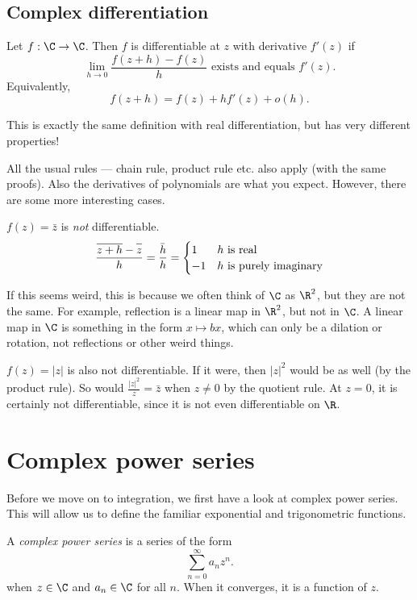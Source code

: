 \documentclass[a4paper]{article}
\begin{document}
\subsection{Complex differentiation}
\begin{defi}
  Let $f: \C \to \C$. Then $f$ is differentiable at $z$ with derivative $f'(z)$ if
  \[
    \lim_{h \to 0}\frac{f(z + h) - f(z)}{h}\text{ exists and equals }f'(z).
  \]
  Equivalently,
  \[
    f(z + h) = f(z) + hf'(z) + o(h).
  \]
\end{defi}
This is exactly the same definition with real differentiation, but has very different properties!

All the usual rules --- chain rule, product rule etc. also apply (with the same proofs). Also the derivatives of polynomials are what you expect. However, there are some more interesting cases.

\begin{eg}
  $f(z) = \bar z$ is \emph{not} differentiable.
  \[
    \frac{\overline{z + h} - \overline{z\vphantom{h}}}{h} = \frac{\bar h}{h} =
    \begin{cases}
      1 & h\text{ is real}\\
      -1 & h\text{ is purely imaginary}
    \end{cases}
  \]
\end{eg}
If this seems weird, this is because we often think of $\C$ as $\R^2$, but they are not the same. For example, reflection is a linear map in $\R^2$, but not in $\C$. A linear map in $\C$ is something in the form $x \mapsto bx$, which can only be a dilation or rotation, not reflections or other weird things.

\begin{eg}
  $f(z) = |z|$ is also not differentiable. If it were, then $|z|^2$ would be as well (by the product rule). So would $\frac{|z|^2}{z} = \bar z$ when $z \not= 0$ by the quotient rule. At $z = 0$, it is certainly not differentiable, since it is not even differentiable on $\R$.
\end{eg}
\section{Complex power series}
Before we move on to integration, we first have a look at complex power series. This will allow us to define the familiar exponential and trigonometric functions.
\begin{defi}
  A \emph{complex power series} is a series of the form
  \[
    \sum_{n = 0}^{\infty}a_n z^n.
  \]
  when $z\in \C$ and $a_n\in \C$ for all $n$. When it converges, it is a function of $z$.
\end{defi}
\end{document}

